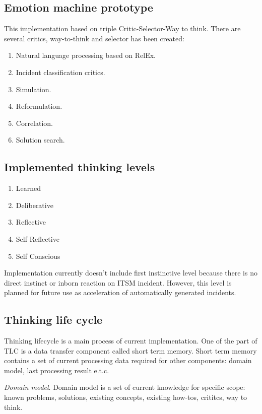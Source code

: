 \documentclass[12pt]{article}
\begin{document}
\subsection{Emotion machine prototype}
This implementation based on triple Critic-Selector-Way to think. There are several critics, way-to-think and selector has been created:

\begin{enumerate}
 \item Natural language processing based on RelEx.
 \item Incident classification critics.
 \item Simulation.
 \item Reformulation.
 \item Correlation.
 \item Solution search.
\end{enumerate}

\subsection{Implemented thinking levels}

\begin{enumerate}
 \item Learned
 \item Deliberative
 \item Reflective
 \item Self Reflective
 \item Self Conscious
\end{enumerate}

Implementation currently doesn’t include first instinctive level because there is no direct instinct or inborn reaction on ITSM incident. However, this level is planned for future use as acceleration of automatically generated incidents.

\subsection{Thinking life cycle}

Thinking lifecycle is a main process of current implementation. One of the part of TLC is a data transfer component called short term memory. Short term memory contains a set of current processing data required for other components: domain model, last processing result e.t.c.

\emph{Domain model}. Domain model is a set of current knowledge for specific scope: known problems, solutions, existing concepts, existing how-tos, crititcs, way to think.\\
\end{document}
